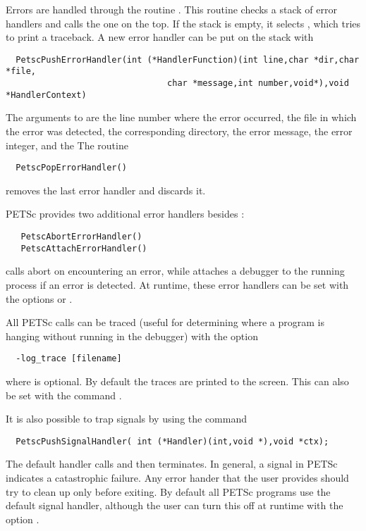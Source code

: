 Errors are handled through the routine . 
 This routine
checks a stack of error handlers and calls the one on the top.  
If the stack is empty, it selects , 
which  tries to print a traceback. 
A new error handler can be put on the stack with
\begin{verbatim}
  PetscPushErrorHandler(int (*HandlerFunction)(int line,char *dir,char *file,
                                char *message,int number,void*),void *HandlerContext)
\end{verbatim}
The arguments to  are the line number where 
the error occurred, the file in which the error was detected, the corresponding
directory, the error message, the error integer, and the 
The routine 
\begin{verbatim} 
  PetscPopErrorHandler()
\end{verbatim}
removes the last error handler and discards it. 

PETSc provides two additional error handlers besides 
:
 
\begin{verbatim}
   PetscAbortErrorHandler()
   PetscAttachErrorHandler()
\end{verbatim}
 calls abort on encountering an error, while
 attaches a debugger to the running process
if an error is detected. At runtime, these error handlers can be set
with the options  or   .

All PETSc calls can be traced (useful for determining where a program is 
hanging without running in the debugger) with the option
\begin{verbatim}
  -log_trace [filename]
\end{verbatim}
where  is optional. By default the traces are printed to the 
screen.  This can also be set with the 
command .  


It is also possible to trap signals by using the 
command 
\begin{verbatim}
  PetscPushSignalHandler( int (*Handler)(int,void *),void *ctx);
\end{verbatim}
The default handler  
calls  
 and then terminates. In general, a signal in PETSc
indicates a catastrophic failure.  Any error hander that the user provides
should try to clean up only before exiting.  By default all PETSc programs
use the default signal handler, although the user can turn this off 
at runtime with the 
option  .


